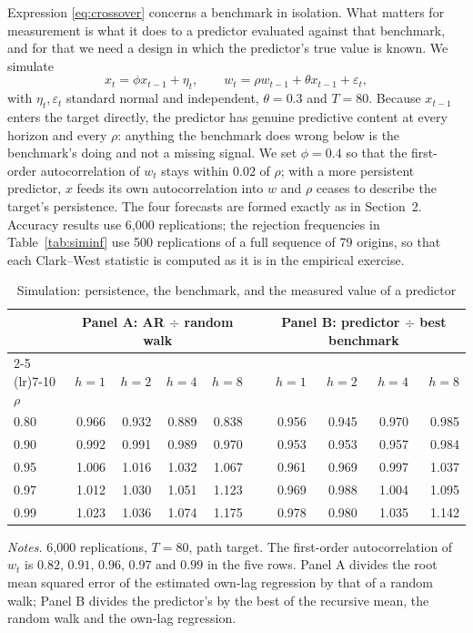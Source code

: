 \documentclass[12pt]{article}
\begin{document}
Expression \eqref{eq:crossover} concerns a benchmark in isolation. What matters
for measurement is what it does to a predictor evaluated against that
benchmark, and for that we need a design in which the predictor's true value is
known. We simulate
\begin{equation}
x_t = \phi x_{t-1} + \eta_t, \qquad
w_t = \rho w_{t-1} + \theta x_{t-1} + \varepsilon_t,
\end{equation}
with $\eta_t, \varepsilon_t$ standard normal and independent, $\theta = 0.3$
and $T = 80$. Because $x_{t-1}$ enters the target directly, the predictor has
genuine predictive content at every horizon and every $\rho$: anything the
benchmark does wrong below is the benchmark's doing and not a missing signal.
We set $\phi = 0.4$ so that the first-order autocorrelation of $w_t$ stays
within $0.02$ of $\rho$; with a more persistent predictor, $x$ feeds its own
autocorrelation into $w$ and $\rho$ ceases to describe the target's
persistence. The four forecasts are formed exactly as in Section~2. Accuracy
results use 6{,}000 replications; the rejection frequencies in
Table~\ref{tab:siminf} use 500 replications of a full sequence of 79 origins,
so that each Clark--West statistic is computed as it is in the empirical
exercise.

\begin{table}[htbp]
\centering
\caption{Simulation: persistence, the benchmark, and the measured value of a predictor}
\label{tab:sim}
\begin{tabular}{lrrrrcrrrr}
\toprule
& \multicolumn{4}{c}{Panel A: AR $\div$ random walk} & &
  \multicolumn{4}{c}{Panel B: predictor $\div$ best benchmark} \\
\cmidrule(lr){2-5} \cmidrule(lr){7-10}
$\rho$ & $h{=}1$ & $h{=}2$ & $h{=}4$ & $h{=}8$ & & $h{=}1$ & $h{=}2$ & $h{=}4$ & $h{=}8$ \\
\midrule
0.80 & 0.966 & 0.932 & 0.889 & 0.838 & & 0.956 & 0.945 & 0.970 & 0.985 \\
0.90 & 0.992 & 0.991 & 0.989 & 0.970 & & 0.953 & 0.953 & 0.957 & 0.984 \\
0.95 & 1.006 & 1.016 & 1.032 & 1.067 & & 0.961 & 0.969 & 0.997 & 1.037 \\
0.97 & 1.012 & 1.030 & 1.051 & 1.123 & & 0.969 & 0.988 & 1.004 & 1.095 \\
0.99 & 1.023 & 1.036 & 1.074 & 1.175 & & 0.978 & 0.980 & 1.035 & 1.142 \\
\bottomrule
\end{tabular}

\vspace{0.5em}
\begin{minipage}{0.95\textwidth}
\footnotesize \textit{Notes.} 6{,}000 replications, $T = 80$, path target. The
first-order autocorrelation of $w_t$ is $0.82$, $0.91$, $0.96$, $0.97$ and
$0.99$ in the five rows. Panel A divides the root mean squared error of the
estimated own-lag regression by that of a random walk; Panel B divides the
predictor's by the best of the recursive mean, the random walk and the own-lag
regression.
\end{minipage}
\end{table}
\end{document}

